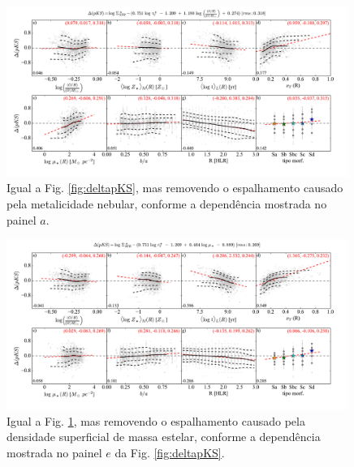 \begin{figure}
	\centering
	\includegraphics[width=0.99\textwidth]{figuras/deltapKS_noOH.pdf}
	\caption[Resíduos da {\em pseudo-KS} removendo o espalhamento com \left(\right)]
	{Igual a Fig. \ref{fig:deltapKS}, mas removendo o espalhamento causado pela metalicidade
nebular, conforme a dependência mostrada no painel $a$.}
	\label{fig:deltapKS_noOH}
\end{figure}

\begin{figure}
	\centering
	\includegraphics[width=0.99\textwidth]{figuras/deltapKS_noMcorSD.pdf}
	\caption[Resíduos da {\em pseudo-KS} removendo o espalhamento com $\mu_\star$]
	{Igual a Fig. \ref{fig:deltapKS_noOH}, mas removendo o espalhamento causado pela
densidade superficial de massa estelar, conforme a dependência mostrada no painel $e$ da Fig.
\ref{fig:deltapKS}.}
	\label{fig:deltapKS_noMcorSD}
\end{figure}

